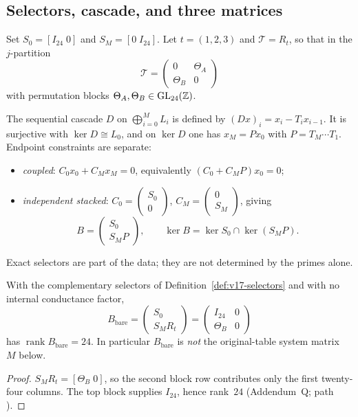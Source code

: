 \subsection{Selectors, cascade, and three matrices}
\begin{definition}\label{def:v17-selectors}
Set $S_0=[I_{24}\;0]$ and $S_M=[0\;I_{24}]$. Let $t=(1,2,3)$ and $\mathcal T=R_t$, so that in the $j$-partition
\[
\mathcal T=\begin{pmatrix}0&\Theta_A\\ \Theta_B&0\end{pmatrix}
\]
with permutation blocks $\Theta_A,\Theta_B\in\mathrm{GL}_{24}(\mathbb{Z})$.
\end{definition}

\begin{definition}\label{def:v17-cascade}
The sequential cascade $D$ on $\bigoplus_{i=0}^{M}L_i$ is defined by $(Dx)_i=x_i-T_i x_{i-1}$. It is surjective with $\ker D\cong L_0$, and on $\ker D$ one has $x_M=Px_0$ with $P=T_M\cdots T_1$. Endpoint constraints are separate:
\begin{itemize}
\item \emph{coupled}: $C_0x_0+C_M x_M=0$, equivalently $(C_0+C_MP)x_0=0$;
\item \emph{independent stacked}: $C_0=\begin{pmatrix}S_0\\0\end{pmatrix}$, $C_M=\begin{pmatrix}0\\S_M\end{pmatrix}$, giving
\[
B=\begin{pmatrix}S_0\\ S_M P\end{pmatrix},\qquad \ker B=\ker S_0\cap\ker(S_MP).
\]
\end{itemize}
Exact selectors are part of the data; they are not determined by the primes alone.
\end{definition}

\begin{theorem}\label{thm:v17-bare}
With the complementary selectors of Definition~\ref{def:v17-selectors} and with no internal conductance factor,
\[
B_{\mathrm{bare}}
=\begin{pmatrix}S_0\\ S_M R_t\end{pmatrix}
=\begin{pmatrix}I_{24}&0\\ \Theta_B&0\end{pmatrix}
\]
has $\operatorname{rank} B_{\mathrm{bare}}=24$. In particular $B_{\mathrm{bare}}$ is \emph{not} the original-table system matrix~$M$ below.
\end{theorem}
\begin{proof}
$S_MR_t=[\Theta_B\;0]$, so the second block row contributes only the first twenty-four columns. The top block supplies $I_{24}$, hence rank~$24$ (Addendum~Q; path ).
\end{proof}

